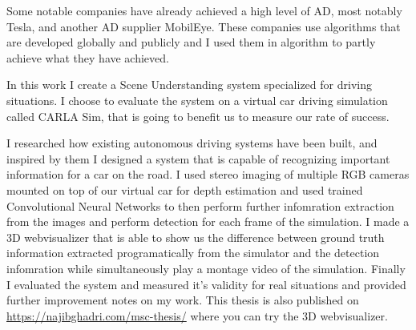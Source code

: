 Some notable companies have already achieved a high level of AD, most notably
Tesla, and another AD supplier MobilEye. These companies use algorithms that are
developed globally and publicly and I used them in algorithm to partly achieve
what they have achieved. 

In this work I create a Scene Understanding system specialized for driving
situations. I choose to evaluate the system on a virtual car driving simulation
called CARLA Sim, that is going to benefit us to measure our rate of success.

I researched how existing autonomous driving systems have been built, and
inspired by them I designed a system that is capable of recognizing important
information for a car on the road. I used stereo imaging of multiple RGB cameras
mounted on top of our virtual car for depth estimation and used trained
Convolutional Neural Networks to then perform further infomration extraction
from the images and perform detection for each frame of the simulation. I made a
3D webvisualizer that is able to show us the difference between ground truth
information extracted programatically from the simulator and the detection
infomration while simultaneously play a montage video of the simulation. Finally
I evaluated the system and measured it's validity for real situations and
provided further improvement notes on my work. This thesis is also published on
\url{https://najibghadri.com/msc-thesis/} where you can try the 3D
webvisualizer.

\vfill
\selectthesislanguage

\setcounter{romanPage}{\value{page}}
